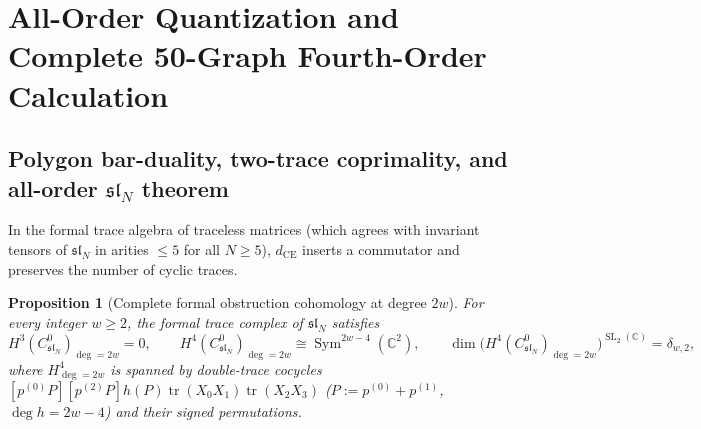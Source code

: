 \documentclass[11pt,letterpaper]{article}
\numberwithin{equation}{section}
\theoremstyle{plain}
\newtheorem{proposition}[theorem]{Proposition}
\theoremstyle{definition}
\theoremstyle{remark}
\newcommand{\fsl}{\mathfrak{sl}}
\newcommand{\tr}{\operatorname{tr}}
\newcommand{\Sym}{\operatorname{Sym}}
\newcommand{\SL}{\operatorname{SL}}
\begin{document}
\section{All-Order Quantization and Complete 50-Graph Fourth-Order Calculation}
\label{sec:allorders-hbar4}

\subsection{Polygon bar-duality, two-trace coprimality, and all-order $\fsl_N$ theorem}
\label{subsec:all-orders}

In the formal trace algebra of traceless matrices (which agrees with invariant tensors of $\fsl_N$ in arities $\le 5$ for all $N \ge 5$), $d_{\mathrm{CE}}$ inserts a commutator and preserves the number of cyclic traces.

\begin{proposition}[Complete formal obstruction cohomology at degree $2w$]
\label{prop:all-order-h4}
For every integer $w \ge 2$, the formal trace complex of $\fsl_N$ satisfies
\begin{equation}
\label{eq:all-order-h3-h4}
H^3(C^0_{\fsl_N})_{\deg=2w} = 0, \qquad
H^4(C^0_{\fsl_N})_{\deg=2w} \cong \Sym^{2w-4}(\mathbb{C}^2), \qquad
\dim\!\big(H^4(C^0_{\fsl_N})_{\deg=2w}\big)^{\SL_2(\mathbb{C})} = \delta_{w,2},
\end{equation}
where $H^4_{\deg=2w}$ is spanned by double-trace cocycles $[p^{(0)}P][p^{(2)}P]h(P)\tr(X_0 X_1)\tr(X_2 X_3)$ ($P := p^{(0)}+p^{(1)}$, $\deg h = 2w - 4$) and their signed permutations.
\end{proposition}
\end{document}

